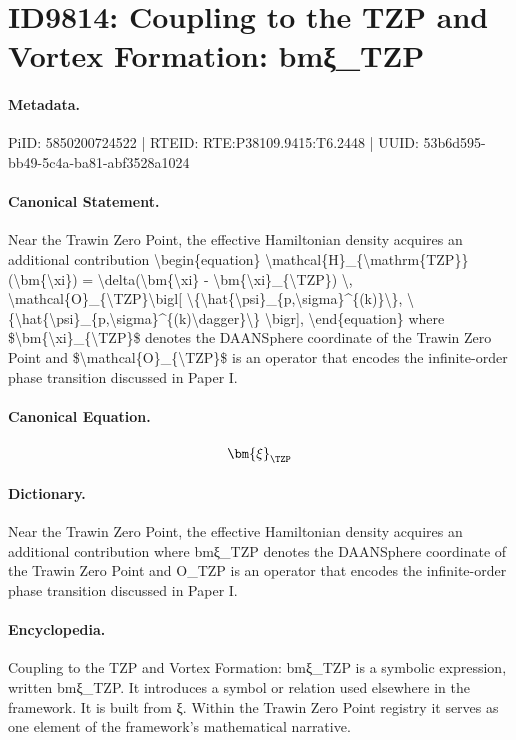 \section*{ID9814: Coupling to the TZP and Vortex Formation: bmξ\_TZP}
\paragraph{Metadata.}
PiID: 5850200724522 | RTEID: RTE:P38109.9415:T6.2448 | UUID: 53b6d595-bb49-5c4a-ba81-abf3528a1024

\paragraph{Canonical Statement.}
Near the Trawin Zero Point, the effective Hamiltonian density acquires an additional contribution \textbackslash{}begin\{equation\} \textbackslash{}mathcal\{H\}\_\{\textbackslash{}mathrm\{TZP\}\}(\textbackslash{}bm\{\textbackslash{}xi\}) = \textbackslash{}delta(\textbackslash{}bm\{\textbackslash{}xi\} - \textbackslash{}bm\{\textbackslash{}xi\}\_\{\textbackslash{}TZP\}) \textbackslash{}, \textbackslash{}mathcal\{O\}\_\{\textbackslash{}TZP\}\textbackslash{}bigl[ \textbackslash{}\{\textbackslash{}hat\{\textbackslash{}psi\}\_\{p,\textbackslash{}sigma\}\textasciicircum{}\{(k)\}\textbackslash{}\}, \textbackslash{}\{\textbackslash{}hat\{\textbackslash{}psi\}\_\{p,\textbackslash{}sigma\}\textasciicircum{}\{(k)\textbackslash{}dagger\}\textbackslash{}\} \textbackslash{}bigr], \textbackslash{}end\{equation\} where \$\textbackslash{}bm\{\textbackslash{}xi\}\_\{\textbackslash{}TZP\}\$ denotes the DAANSphere coordinate of the Trawin Zero Point and \$\textbackslash{}mathcal\{O\}\_\{\textbackslash{}TZP\}\$ is an operator that encodes the infinite-order phase transition discussed in Paper I.

\paragraph{Canonical Equation.}
\[
\bm{\xi}_{\TZP}
\]

\paragraph{Dictionary.}
Near the Trawin Zero Point, the effective Hamiltonian density acquires an additional contribution where bmξ\_TZP denotes the DAANSphere coordinate of the Trawin Zero Point and O\_TZP is an operator that encodes the infinite-order phase transition discussed in Paper I.

\paragraph{Encyclopedia.}
Coupling to the TZP and Vortex Formation: bmξ\_TZP is a symbolic expression, written bmξ\_TZP. It introduces a symbol or relation used elsewhere in the framework. It is built from ξ. Within the Trawin Zero Point registry it serves as one element of the framework's mathematical narrative.
